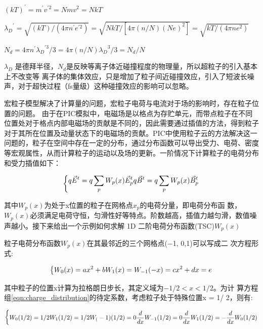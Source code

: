 $(kT)^'  = m^'  v^{'2} = Nmv^2 = NkT$

${{\lambda}_D}^' = \sqrt{ (kT)/(4 \pi n^' e^{'2})} = \sqrt{NkT/[4 \pi (n/N)(Ne)^2]} = \sqrt{ kT/(4 \pi ne^2 )}$

$N_d=4\pi n^' {{\lambda}_D}^{'3}/3= 4 \pi (n/N) {{\lambda}_D}^{3} /3 = N_d/N $

${{\lambda}_D} $ 是德拜半径，$N_d$是反映等离子体近碰撞程度的物理量，所以超粒子的引入基本上不改变等
离子体的集体效应，只是增加了粒子间近碰撞效应，引入了短波长噪声，对于超快过程（fs量级）这种碰撞效应的影响可以忽略。

宏粒子模型解决了计算量的问题，宏粒子电荷与电流对于场的影响时，存在粒子位置的问题。 由于在PIC模拟中，电磁场是以格点为存贮单元，而带点粒子在不同位置处对于格点内部电磁场的贡献是不同的，因此需要通过插值的方法，得到粒子对于其所在位置及动量状态下的电磁场的贡献。PIC中使用粒子云的方法解决这一问题的，粒子在空间中存在一定的分布，通过分布函数可以导出受力、电荷、密度等宏观属性，从而计算粒子的运动以及场的更新。一阶情况下计算粒子的电荷分布和受力插值如下：


\begin{equation}
\label{eqn:current_interpolate}
\begin{dcases*}

q\vec{E}^t=q \sum_p W_p(x){\vec{E}_p}^t
q\vec{B}^t=q \sum_p W_p(x){\vec{B}_p}^t

\end{dcases*}
\end{equation} 



其中$W_p(x)$为处于x位置的粒子在网格点$x_p$的电荷分量，即电荷分布函
数，$W_p(x)$必须满足电荷守恒，匀滑性好等特点。阶数越高，插值力越匀滑，数值噪声越小。接下来给出一个示例如何求解
1D 二阶电荷分布函数(TSC)$W_p(x)$

粒子电荷分布函数$W_p(x)$在其最邻近的三个网格点(−1, 0,1)可以写成二
次方程形式:

\begin{equation}
\label{eqn:charge_distribution}
\begin{dcases*}


W_0(x)=ax^2+b
W_1(x)=W_{-1}(-x)=cx^2+dx=e


\end{dcases*}
\end{equation} 

其中粒子的位置x计算为拉格朗日步长，其定义域为$-1/2<x<1/2$。为计
算方程组\ref{eqn:charge_distribution}的待定系数，考虑粒子处于特殊位置x = 1/ 2，则有:

\begin{equation}
\begin{dcases*}


W_0(1/2)=1/2
W_1(1/2)=1/2
W_(-1)(1/2)=0
\frac{d}{dx} W_{-1}(1/2)=0
\frac{d}{dx} W_{1}(1/2)=-\frac{d}{dx} W_{0}(1/2)

\end{dcases*}
\end{equation} 



